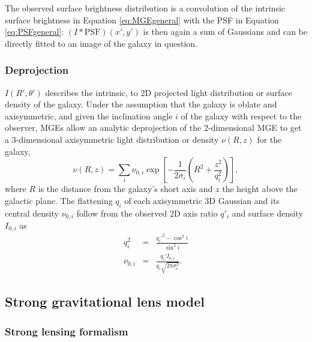 \documentclass[useAMS,usenatbib]{mnras}
\begin{document}
The observed surface brightness distribution is a convolution of the intrinsic surface brightness in Equation \eqref{eq:MGEgeneral} with the PSF in Equation \eqref{eq:PSFgeneral}: $(I \ast \text{PSF}) (x',y')$ is then again a sum of Gaussians and can be directly fitted to an image of the galaxy in question.

\subsubsection{Deprojection} \label{sec:MGE_theo_deprojection}

$I(R',\theta')$ describes the intrinsic, to 2D projected light distribution or surface density of the galaxy. Under the assumption that the galaxy is oblate and axisymmetric, and given the inclination angle $i$ of the galaxy with respect to the observer, MGEs allow an analytic deprojection of the 2-dimensional MGE to get a 3-dimensional axisymmetric light distribution or density $\nu(R,z)$ for the galaxy,
\begin{equation}
\nu(R,z) = \sum_i \nu_{0,i} \exp \left[-\frac{1}{2\sigma_i}\left(R^2 + \frac{z^2}{q_i^2} \right) \right], \label{eq:deprojMGE}
\end{equation}
where $R$ is the distance from the galaxy's short axis and $z$ the height above the galactic plane. The flattening $q_i$ of each axisymmetric 3D Gaussian and its central density $\nu_{0,i}$ follow from the observed 2D axis ratio $q'_i$ and surface density $I_{0,i}$ as
\begin{eqnarray}
q_i^2 &=& \frac{q_i'^2 - \cos^2 i}{\sin^2 i}\\
\nu_{0,i} &=& \frac{q_i' I_{0,i}}{q_i \sqrt{2 \pi \sigma_i^2}}.
\end{eqnarray}

\subsection{Strong gravitational lens model} \label{sec:lensing_theo}

\subsubsection{Strong lensing formalism}
\end{document}

